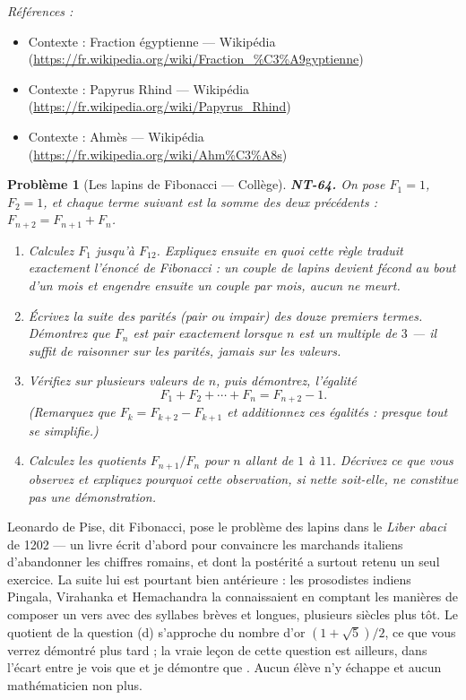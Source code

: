 \documentclass[11pt]{article}
\newtheorem{problem}{Problème}
\newenvironment{refs}{\par\small\noindent\emph{Références :}\begin{itemize}\setlength\itemsep{0pt}}{\end{itemize}\normalsize}
\begin{document}
\begin{refs}
\item Contexte : Fraction égyptienne --- Wikipédia (\url{https://fr.wikipedia.org/wiki/Fraction_%C3%A9gyptienne})
\item Contexte : Papyrus Rhind --- Wikipédia (\url{https://fr.wikipedia.org/wiki/Papyrus_Rhind})
\item Contexte : Ahmès --- Wikipédia (\url{https://fr.wikipedia.org/wiki/Ahm%C3%A8s})
\end{refs}

\bigskip

\begin{problem}[{Les lapins de Fibonacci --- Collège}]
\textbf{NT-64.} On pose $ F_1 = 1 $, $ F_2 = 1 $, et chaque terme suivant est la somme des
deux précédents : $ F_{n+2} = F_{n+1} + F_n $.
\begin{enumerate}
\item[(a)] Calculez $ F_1 $ jusqu'à $ F_{12} $. Expliquez ensuite en quoi cette règle traduit exactement
l'énoncé de Fibonacci : un couple de lapins devient fécond au bout d'un mois et engendre ensuite un
couple par mois, aucun ne meurt.
\item[(b)] Écrivez la suite des parités (pair ou impair) des douze premiers termes. Démontrez que $ F_n $
est pair exactement lorsque $ n $ est un multiple de $ 3 $ --- il suffit de raisonner sur les
parités, jamais sur les valeurs.
\item[(c)] Vérifiez sur plusieurs valeurs de $ n $, puis démontrez, l'égalité
\[ F_1 + F_2 + \cdots + F_n = F_{n+2} - 1 . \]
(Remarquez que $ F_k = F_{k+2} - F_{k+1} $ et additionnez ces égalités : presque tout se
simplifie.)
\item[(d)] Calculez les quotients $ F_{n+1} / F_n $ pour $ n $ allant de $ 1 $ à $ 11 $. Décrivez ce
que vous observez et expliquez pourquoi cette observation, si nette soit-elle, ne constitue pas une
démonstration.
\end{enumerate}

\end{problem}

\noindent Leonardo de Pise, dit Fibonacci, pose le problème des lapins dans le \textit{Liber
abaci} de 1202 --- un livre écrit d'abord pour convaincre les marchands italiens d'abandonner les
chiffres romains, et dont la postérité a surtout retenu un seul exercice. La suite lui est
pourtant bien antérieure : les prosodistes indiens Pingala, Virahanka et Hemachandra la connaissaient
en comptant les manières de composer un vers avec des syllabes brèves et longues, plusieurs siècles
plus tôt. Le quotient de la question (d) s'approche du nombre d'or $ (1 + \sqrt{5})/2 $, ce que vous
verrez démontré plus tard ; la vraie leçon de cette question est ailleurs, dans l'écart entre
\og{} je vois que \fg{} et \og{} je démontre que \fg{}. Aucun élève n'y échappe et aucun mathématicien non plus.
\end{document}
